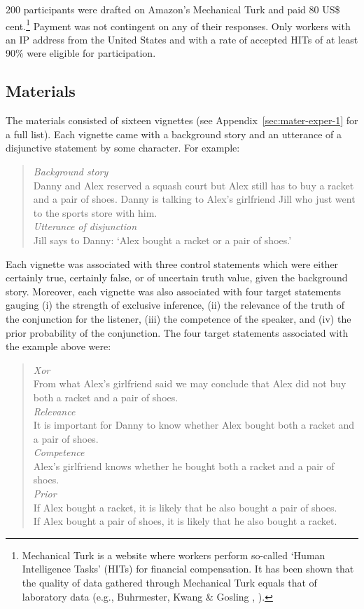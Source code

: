 \documentclass[12pt]{article}
\begin{document}
200 participants were drafted on Amazon's Mechanical Turk and paid 80 US\$
cent.\footnote{Mechanical Turk is a website where workers perform so-called `Human Intelligence
  Tasks' (HITs) for financial compensation. It has been shown that the quality of data gathered
  through Mechanical Turk equals that of laboratory data (e.g., Buhrmester, Kwang \& Gosling
  \citeyear{buhrmester2011}, \citealt{schnoebelen2010, sprouse2011}).} Payment was not
contingent on any of their responses. Only workers with an IP address from the United States
and with a rate of accepted HITs of at least 90\% were eligible for participation.

\subsection*{Materials}

The materials consisted of sixteen vignettes (see Appendix~\ref{sec:mater-exper-1} for a full
list). Each vignette came with a background story and an utterance of a
disjunctive statement by some character. For example:

\begin{quote}
  \emph{Background story} \\
  Danny and Alex reserved a squash court but Alex still has to buy a racket and a pair of
  shoes. Danny is talking to Alex's girlfriend Jill who just went to the sports store with
  him.\\[.2cm]
  \emph{Utterance of disjunction}\\
  Jill says to Danny: `Alex bought a racket or a pair of shoes.'
\end{quote}

\noindent Each vignette was associated with three control statements which were either
certainly true, certainly false, or of uncertain truth value, given the background
story. Moreover, each vignette was also associated with four target statements gauging (i) the
strength of exclusive inference, (ii) the relevance of the truth of the conjunction for the
listener, (iii) the competence of the speaker, and (iv) the prior probability of the
conjunction. The four target statements associated with the example above were:

\begin{quote}
  \emph{Xor}\\
  From what Alex's girlfriend said we may conclude that Alex did not buy both a racket and a
  pair of shoes.\\[.2cm]
  \emph{Relevance} \\ It is important for Danny to know whether Alex bought both a racket and a
  pair of shoes.\\[.2cm]
  \emph{Competence} \\ Alex's girlfriend knows whether he bought both a racket and a pair of shoes. \\[.2cm]
  \emph{Prior} \\ If Alex bought a racket, it is likely that he also bought a pair of shoes. \\
  If Alex bought a pair of shoes, it is likely that he also bought a racket.
\end{quote}
\end{document}
